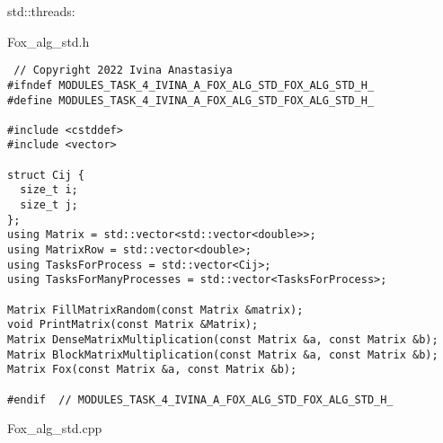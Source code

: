 \documentclass{report}
\begin{document}
std::threads:
 \par Fox\_alg\_std.h
 \begin{lstlisting}
 // Copyright 2022 Ivina Anastasiya
#ifndef MODULES_TASK_4_IVINA_A_FOX_ALG_STD_FOX_ALG_STD_H_
#define MODULES_TASK_4_IVINA_A_FOX_ALG_STD_FOX_ALG_STD_H_

#include <cstddef>
#include <vector>

struct Cij {
  size_t i;
  size_t j;
};
using Matrix = std::vector<std::vector<double>>;
using MatrixRow = std::vector<double>;
using TasksForProcess = std::vector<Cij>;
using TasksForManyProcesses = std::vector<TasksForProcess>;

Matrix FillMatrixRandom(const Matrix &matrix);
void PrintMatrix(const Matrix &Matrix);
Matrix DenseMatrixMultiplication(const Matrix &a, const Matrix &b);
Matrix BlockMatrixMultiplication(const Matrix &a, const Matrix &b);
Matrix Fox(const Matrix &a, const Matrix &b);

#endif  // MODULES_TASK_4_IVINA_A_FOX_ALG_STD_FOX_ALG_STD_H_
 \end{lstlisting}
  Fox\_alg\_std.cpp
\end{document}
